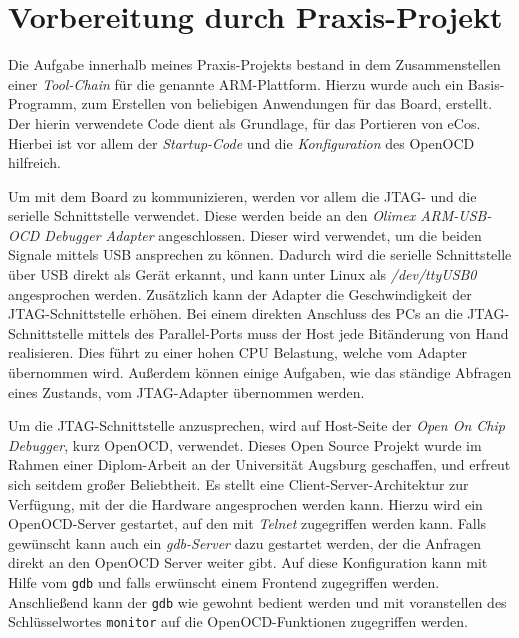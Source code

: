 \documentclass[
  a4paper,					%
  twoside,
  DIV=calc,     				%
  bibliography=totoc,
  cleardoublepage=empty,
  ngerman,     					%
  final       					%
]{scrbook}
\begin{document}
\section{Vorbereitung durch Praxis-Projekt}
\label{sec:Vorbereitung}
Die Aufgabe innerhalb meines Praxis-Projekts bestand in dem Zusammenstellen einer \emph{Tool-Chain} für die genannte ARM-Plattform. Hierzu wurde auch ein Basis-Programm, zum Erstellen von beliebigen Anwendungen für das Board, erstellt. Der hierin verwendete Code dient als Grundlage, für das Portieren von eCos. Hierbei ist vor allem der \emph{Startup-Code} und die \emph{Konfiguration} des OpenOCD hilfreich.

Um mit dem Board zu kommunizieren, werden vor allem die JTAG- und die serielle Schnittstelle verwendet. Diese werden beide an den \emph{Olimex ARM-USB-OCD Debugger Adapter} angeschlossen. Dieser wird verwendet, um die beiden Signale mittels USB ansprechen zu können. Dadurch wird die serielle Schnittstelle über USB direkt als Gerät erkannt, und kann unter Linux als \emph{/dev/ttyUSB0} angesprochen werden. Zusätzlich kann der Adapter die Geschwindigkeit der JTAG-Schnittstelle erhöhen. Bei einem direkten Anschluss des PCs an die JTAG-Schnittstelle mittels des Parallel-Ports muss der Host jede Bitänderung von Hand realisieren. Dies führt zu einer hohen CPU Belastung, welche vom Adapter übernommen wird. Außerdem können einige Aufgaben, wie das ständige Abfragen eines Zustands, vom JTAG-Adapter übernommen werden.

Um die JTAG-Schnittstelle anzusprechen, wird auf Host-Seite der \emph{Open On Chip Debugger}, kurz OpenOCD, verwendet. Dieses Open Source Projekt wurde im Rahmen einer Diplom-Arbeit an der Universität Augsburg geschaffen, und erfreut sich seitdem großer Beliebtheit. Es stellt eine Client-Server-Architektur zur Verfügung, mit der die Hardware angesprochen werden kann. Hierzu wird ein OpenOCD-Server gestartet, auf den mit \emph{Telnet} zugegriffen werden kann. Falls gewünscht kann auch ein \emph{gdb-Server} dazu gestartet werden, der die Anfragen direkt an den OpenOCD Server weiter gibt. Auf diese Konfiguration kann mit Hilfe vom \texttt{gdb} und falls erwünscht einem Frontend zugegriffen werden. Anschließend kann der \texttt{gdb} wie gewohnt bedient werden und mit voranstellen des Schlüsselwortes \texttt{monitor} auf die OpenOCD-Funktionen zugegriffen werden.
\end{document}
